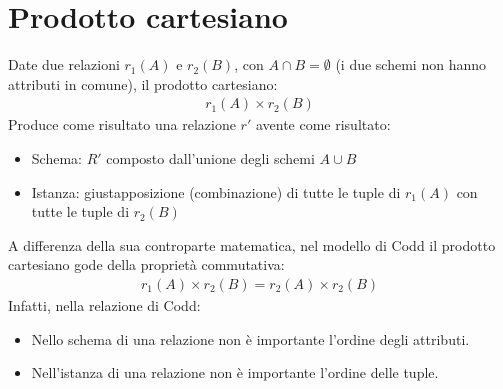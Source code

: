 \section{Prodotto cartesiano}
Date due relazioni $r_1(A)$ e $r_2(B)$, con $A \cap B = \emptyset$ (i due schemi non hanno attributi in comune), il prodotto cartesiano:
    \begin{equation}\begin{aligned}
        r_1(A) \times r_2(B)
    \end{aligned}\end{equation}
Produce come risultato una relazione $r'$ avente come risultato:
    \begin{itemize}
        \item{Schema: $R'$ composto dall'unione degli schemi $A \cup B$}
        \item{Istanza: giustapposizione (combinazione) di tutte le tuple di $r_1(A)$ con tutte le tuple di $r_2(B)$}
    \end{itemize}
A differenza della sua controparte matematica, nel modello di Codd il prodotto cartesiano gode della proprietà commutativa:
    \begin{equation}\begin{aligned}
        r_1(A) \times r_2(B) = r_2(A) \times r_2(B)
    \end{aligned}\end{equation}
Infatti, nella relazione di Codd:
    \begin{itemize}
        \item{Nello schema di una relazione non è importante l'ordine degli attributi.}
        \item{Nell'istanza di una relazione non è importante l'ordine delle tuple.}
    \end{itemize}
